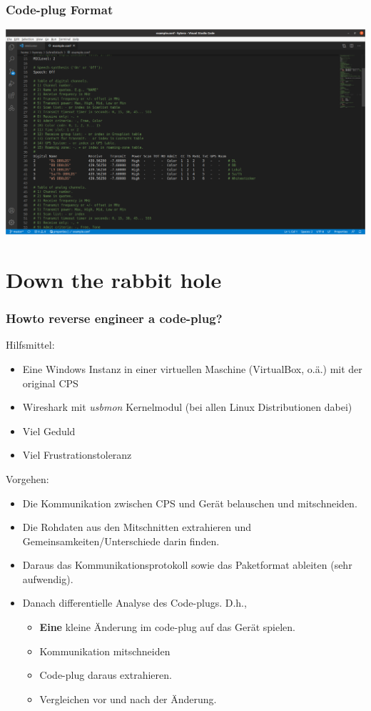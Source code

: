 \documentclass[aspectratio=169]{beamer}
\begin{document}
\begin{frame} \frametitle{Code-plug Format}
\begin{center}
 \includegraphics[width=0.9\linewidth]{../fig/qdmr-codeplug-format.png}
\end{center}
\end{frame}


\section{Down the rabbit hole}
\begin{frame} \frametitle{Howto reverse engineer a code-plug?}
 Hilfsmittel:
 \begin{itemize}
  \item Eine Windows Instanz in einer virtuellen Maschine (VirtualBox, o.ä.) mit der original CPS
  \item Wireshark mit \emph{usbmon} Kernelmodul (bei allen Linux Distributionen dabei)
  \item Viel Geduld
  \item Viel Frustrationstoleranz
 \end{itemize}
 Vorgehen:
 \begin{itemize}
  \item Die Kommunikation zwischen CPS und Gerät belauschen und mitschneiden.
  \item Die Rohdaten aus den Mitschnitten extrahieren und Gemeinsamkeiten/Unterschiede darin finden.
  \item Daraus das Kommunikationsprotokoll sowie das Paketformat ableiten (sehr aufwendig).
  \item Danach differentielle Analyse des Code-plugs. D.h., 
  \begin{itemize}
    \item \textbf{Eine} kleine Änderung im code-plug auf das Gerät spielen.
    \item Kommunikation mitschneiden
    \item Code-plug daraus extrahieren.
    \item Vergleichen vor und nach der Änderung.
  \end{itemize}
 \end{itemize}
\end{frame}
\end{document}
